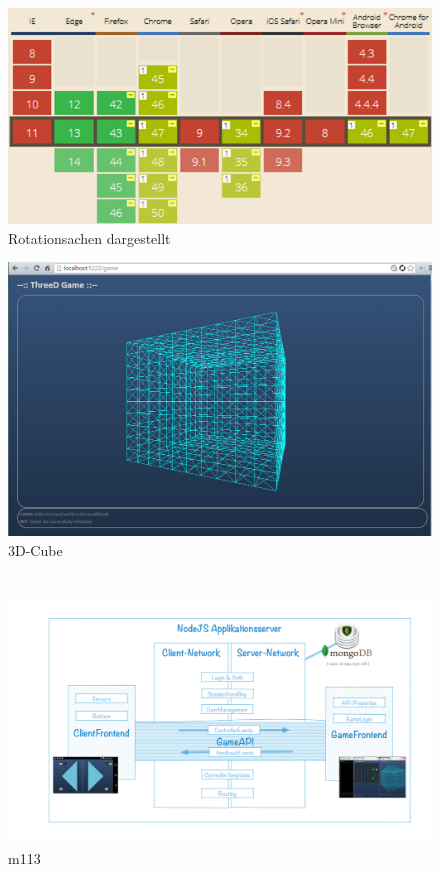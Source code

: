\documentclass[a4paper]{spie}  %
\begin{document}
\section{}
	\begin{figure}[H]
		\includegraphics{images/caniuseGetUserMedia}
		\caption{Rotationsachen dargestellt}
		\label{rotation}
	\end{figure}

\begin{figure}[H]
	\centering
	\includegraphics[width=1\textwidth]{images/FrontendInit}
	\caption{3D-Cube}
	\label{3dcube}
\end{figure}

\section{}
\begin{figure}[H]
	\centering
	\includegraphics[width=1\textwidth]{images/arch/M113.png}
	\caption{m113}
	\label{m113}
\end{figure}
\end{document}
